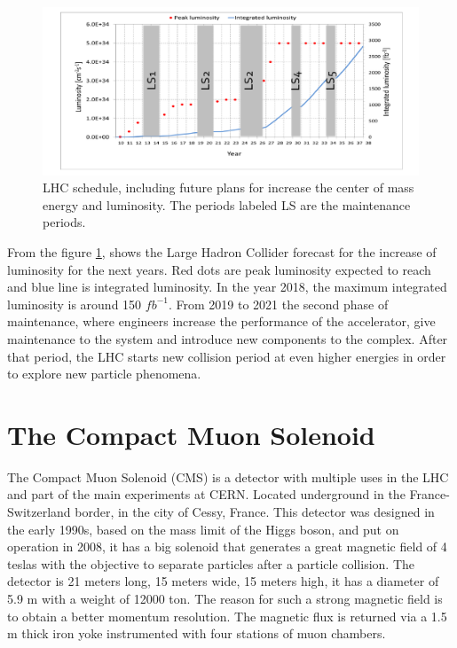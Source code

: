 \begin{figure}[!htbp]
\centering
\includegraphics[scale=0.5]{Chapter2/lum6.png}
\caption{LHC schedule, including future plans for increase the center of mass energy and luminosity. The periods labeled LS are the maintenance periods\cite{cern3}.}
\label{lhc-lumi}
\end{figure}
From the figure \ref{lhc-lumi}, shows the Large Hadron Collider forecast for the increase of luminosity for the next years. Red dots are peak luminosity expected to reach and blue line is integrated luminosity. In the year 2018, the maximum integrated luminosity is around 150 $fb^{-1}$\cite{cern3}. From 2019 to 2021 the second phase of maintenance, where engineers increase the performance of the accelerator, give maintenance to the system and introduce new components to the complex. After that period, the LHC starts new collision period at even higher energies in order to explore new particle phenomena.

\pagebreak

\section{The Compact Muon Solenoid}	
The Compact Muon Solenoid (CMS) is a detector with multiple uses in the LHC and part of the main experiments at CERN. Located underground in the France- Switzerland border, in the city of Cessy, France.
This detector was designed in the early 1990s, based on the mass limit of the Higgs boson, and put on operation in 2008, it has a big solenoid that generates a great magnetic field of 4 teslas with the objective to separate particles after a particle collision.
 The detector is 21 meters long, 15 meters wide, 15 meters high, it has a diameter of 5.9 m with a weight of 12000 ton. The reason for such a strong magnetic field is to obtain a better momentum resolution.
 The magnetic flux is returned via a 1.5 m thick iron yoke instrumented with four stations of muon
 chambers.



